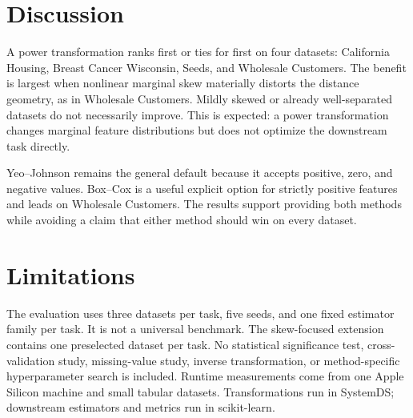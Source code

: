 \documentclass[11pt,a4paper]{article}
\begin{document}
\section{Discussion}

A power transformation ranks first or ties for first on four datasets:
California Housing, Breast Cancer Wisconsin, Seeds, and Wholesale Customers.
The benefit is largest when nonlinear marginal skew materially distorts the
distance geometry, as in Wholesale Customers. Mildly skewed or already
well-separated datasets do not necessarily improve. This is expected: a power
transformation changes marginal feature distributions but does not optimize the
downstream task directly.

Yeo--Johnson remains the general default because it accepts positive, zero, and
negative values. Box--Cox is a useful explicit option for strictly positive
features and leads on Wholesale Customers. The results support providing both
methods while avoiding a claim that either method should win on every dataset.

\section{Limitations}

The evaluation uses three datasets per task, five seeds, and one fixed estimator
family per task. It is not a universal benchmark. The skew-focused extension
contains one preselected dataset per task. No statistical significance test,
cross-validation study, missing-value study, inverse transformation, or
method-specific hyperparameter search is included. Runtime measurements come
from one Apple Silicon machine and small tabular datasets. Transformations run
in SystemDS; downstream estimators and metrics run in scikit-learn.
\end{document}
